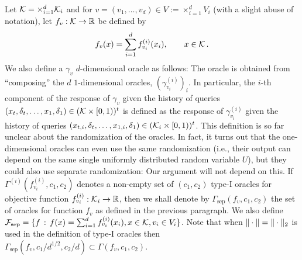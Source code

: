 Let $\mathcal{K} = \times_{i=1}^d \mathcal{K}_i$ and for $v = (v_1,\dots,v_d) \in V:= \times_{i=1}^d V_i$ (with a slight abuse of notation), let $f_v: \mathcal{K} \to \mathbb{R}$ be defined by
\begin{align}
f_v(x) = \sum_{i=1}^d f^{(i)}_{v_i}(x_i), \qquad x\in \mathcal{K}\,. \label{eq:sepfdef}
\end{align}
We also define a $\gamma_v$  $d$-dimensional oracle as follows: 
The oracle  is obtained from ``composing'' the $d$ $1$-dimensional oracles, $(\gamma_{v_i}^{(i)})_{i}$.
In particular, the $i$-th component of the response of $\gamma_v$ 
given the history of queries $(x_{t},\delta_{t},\dots,x_1,\delta_1)\in (\mathcal{K} \times [0,1))^t$
is defined as the response of $\gamma^{(i)}_{v_i}$ 
given the history of queries $(x_{t,i},\delta_{t},\dots,x_{1,i},\delta_1)\in (\mathcal{K}_i\times [0,1))^t$.
This definition is so far unclear about the randomization of the oracles. 
In fact, it turns out that the one-dimensional oracles can even use the same randomization (i.e.,
their output can depend on the same single uniformly distributed random variable $U$), but they could also use separate randomization: Our argument will not depend on this.
\newcommand{\sep}{\mathrm{sep}}
If $\Gamma^{(i)}(f_{v_i}^{(i)},c_1,c_2)$ 
denotes a non-empty set of $(c_1,c_2)$ type-I oracles for objective function $f^{(i)}_{v_i}:\mathcal{K}_i \to \mathbb{R}$,
then we shall denote by $\Gamma_\sep(f_v,c_1,c_2)$ the set of oracles for function $f_v$ 
as defined in the previous paragraph.
We also define $\cF_\sep = \{ f\,: \, f(x) = \sum_{i=1}^d f^{(i)}_{v_i}(x_i), x\in \cK, v_i\in V_i \}$.
Note that when $\|\cdot\| = \|\cdot\|_2$ is used in the definition of type-I oracles then
$\Gamma_\sep(f_v,c_1/d^{1/2},c_2/d) \subset \Gamma(f_v,c_1,c_2)$.

